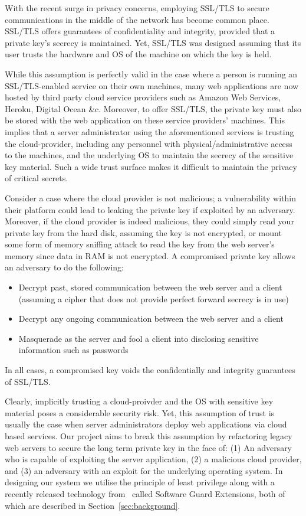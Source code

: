 \documentclass[../main.tex]{subfiles}
\begin{document}
With the recent surge in privacy concerns, employing SSL/TLS to secure
communications in the middle of the network has become common
place. SSL/TLS offers guarantees of confidentiality and integrity,
provided that a private key's secrecy is maintained. Yet, SSL/TLS was
designed assuming that its user trusts the hardware and OS of the
machine on which the key is held.
 
While this assumption is perfectly valid in the case where a person is
running an SSL/TLS-enabled service on their own machines, many web
applications are now hosted by third party cloud service providers
such as Amazon Web Services, Heroku, Digital Ocean \&c. Moreover, to
offer SSL/TLS, the private key must also be stored with the web
application on these service providers' machines. This implies that a
server administrator using the aforementioned services is trusting the
cloud-provider, including any personnel with physical/administrative
access to the machines, and the underlying OS to maintain the secrecy
of the sensitive key material. Such a wide trust surface makes it
difficult to maintain the privacy of critical secrets.


Consider a case where the cloud provider is not malicious; a
vulnerability within their platform could lead to leaking the private
key if exploited by an adversary. Moreover, if the cloud provider is
indeed malicious, they could simply read your private key from the hard
disk, assuming the key is not encrypted, or mount some form of memory
sniffing attack to read the key from the web server's memory since
data in RAM is not encrypted. A compromised private key allows an
adversary to do the following:
\begin{itemize}
  \item Decrypt past, stored communication between the web server and a
    client (assuming a cipher that does not provide perfect forward
    secrecy is in use)
  \item Decrypt any ongoing communication between the web server and a
    client
  \item Masquerade as the server and fool a client into disclosing
    sensitive information such as passwords
\end{itemize}
In all cases, a compromised key voids the confidentially and integrity
guarantees of SSL/TLS.

Clearly, implicitly trusting a cloud-proivder and the OS with
sensitive key material poses a considerable security risk. Yet, this
assumption of trust is usually the case when server administrators
deploy web applications via cloud based services. Our project aims to
break this assumption by refactoring legacy web servers to secure the
long term private key in the face of: (1) An adversary who is capable
of exploiting the server application, (2) a malicious cloud provider,
and (3) an adversary with an exploit for the underlying operating
system. In designing our system we utilise the principle of least
privilege along with a recently released technology from
\Intel~called Software Guard Extensions, both of which are described
in Section~\ref{sec:background}.
\end{document}
